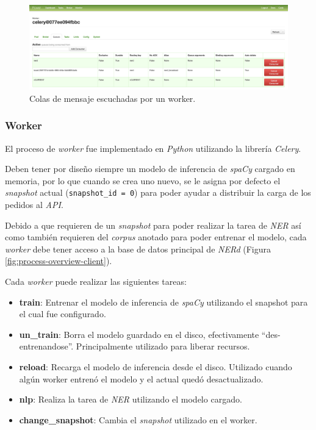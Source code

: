 \documentclass[12pt,a4paper,]{scrartcl}
\providecommand{\tightlist}{%
  \setlength{\itemsep}{0pt}\setlength{\parskip}{0pt}}
\begin{document}
\begin{figure}[H]

{\centering \includegraphics{assets/developer/flower-worker-queues.png} 

}

\caption{Colas de mensaje escuchadas por un worker.}\label{fig:developer-flower-worker-queues}
\end{figure}

\hypertarget{worker-1}{%
\subsubsection{Worker}\label{worker-1}}

El proceso de \emph{worker} fue implementado en \emph{Python} utilizando la librería \emph{Celery}.

Deben tener por diseño siempre un modelo de inferencia de \emph{spaCy} cargado en memoria, por lo que cuando se crea uno nuevo, se le asigna por defecto el \emph{snapshot} actual (\texttt{snapshot\_id\ =\ 0}) para poder ayudar a distribuir la carga de los pedidos al \emph{API}.

Debido a que requieren de un \emph{snapshot} para poder realizar la tarea de \emph{NER} así como también requieren del \emph{corpus} anotado para poder entrenar el modelo, cada \emph{worker} debe tener acceso a la base de datos principal de \emph{NERd} (Figura \ref{fig:process-overview-client}).

Cada \emph{worker} puede realizar las siguientes tareas:

\begin{itemize}
\tightlist
\item
  \textbf{train}: Entrenar el modelo de inferencia de \emph{spaCy} utilizando el snapshot para el cual fue configurado.
\item
  \textbf{un\_train}: Borra el modelo guardado en el disco, efectivamente \enquote{des-entrenandose}. Principalmente utilizado para liberar recursos.
\item
  \textbf{reload}: Recarga el modelo de inferencia desde el disco. Utilizado cuando algún worker entrenó el modelo y el actual quedó desactualizado.
\item
  \textbf{nlp}: Realiza la tarea de \emph{NER} utilizando el modelo cargado.
\item
  \textbf{change\_snapshot}: Cambia el \emph{snapshot} utilizado en el worker.
\end{itemize}
\end{document}
